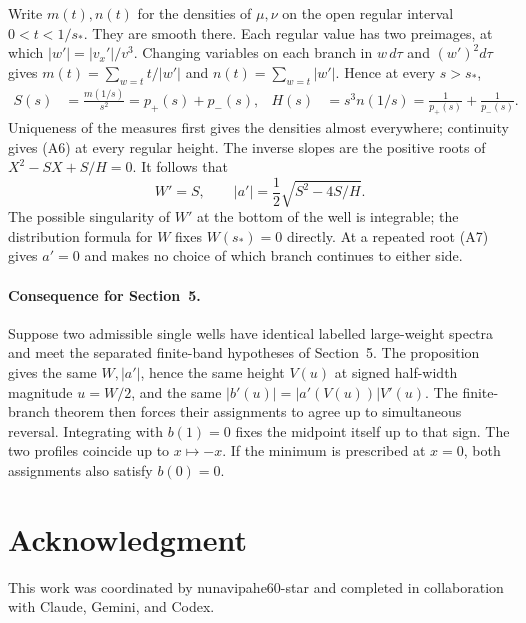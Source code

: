 \documentclass[11pt,letterpaper]{article}
\begin{document}
Write \(m(t),n(t)\) for the densities of \(\mu,\nu\) on the open
regular interval \(0<t<1/s_*\). They are smooth there. Each regular
value has two preimages, at which \( |w'|=|v_x'|/v^3\).
Changing variables on each branch in \(w\,d\tau\) and \((w')^2d\tau\)
gives \(m(t)=\sum_{w=t} t/|w'|\) and \(n(t)=\sum_{w=t}|w'|\).
Hence at every \(s>s_*\),
\begin{align}
 S(s)&=\frac{m(1/s)}{s^2}=p_+(s)+p_-(s),&
 H(s)&=s^3 n(1/s)=\frac1{p_+(s)}+\frac1{p_-(s)}. \tag{A6}
\end{align}
Uniqueness of the measures first gives the densities almost everywhere;
continuity gives (A6) at every regular height. The inverse slopes are
the positive roots of \(X^2-SX+S/H=0\). It follows that
\[
 W'=S,\qquad |a'|=\frac12\sqrt{S^2-4S/H}.
 \tag{A7}
\]
The possible singularity of \(W'\) at the bottom of the well is
integrable; the distribution formula for \(W\) fixes \(W(s_*)=0\)
directly. At a repeated root (A7) gives \(a'=0\) and makes no choice
of which branch continues to either side.

\paragraph{Consequence for Section~5.}
Suppose two admissible single wells have identical labelled large-weight
spectra and meet the separated finite-band hypotheses of Section~5.
The proposition gives the same \(W,|a'|\), hence the same height
\(V(u)\) at signed half-width magnitude \(u=W/2\), and the same
\(|b'(u)|=|a'(V(u))|V'(u)\). The finite-branch theorem then forces
their assignments to agree up to simultaneous reversal. Integrating
with \(b(1)=0\) fixes the midpoint itself up to that sign. The two
profiles coincide up to \(x\mapsto-x\). If the minimum is prescribed
at \(x=0\), both assignments also satisfy \(b(0)=0\).

\section*{Acknowledgment}
This work was coordinated by nunavipahe60-star and completed in
collaboration with Claude, Gemini, and Codex.
\end{document}
